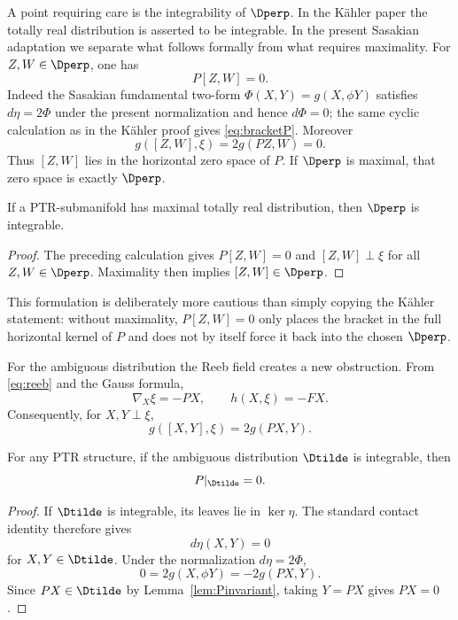 \documentclass[11pt]{article}
\theoremstyle{definition}\newtheorem{definition}[theorem]{Definition}\newtheorem{example}[theorem]{Example}
\theoremstyle{remark}\newtheorem{remark}[theorem]{Remark}
\begin{document}
A point requiring care is the integrability of $\Dperp$. In the K\"ahler paper the totally real distribution is asserted to be integrable. In the present Sasakian adaptation we separate what follows formally from what requires maximality. For $Z,W\in\Dperp$, one has
\begin{equation}\label{eq:bracketP}
 P[Z,W]=0.
\end{equation}
Indeed the Sasakian fundamental two-form $\Phi(X,Y)=g(X,\phi Y)$ satisfies $d\eta=2\Phi$ under the present normalization and hence $d\Phi=0$; the same cyclic calculation as in the K\"ahler proof gives \eqref{eq:bracketP}. Moreover
\[
 g([Z,W],\xi)=2g(PZ,W)=0.
\]
Thus $[Z,W]$ lies in the horizontal zero space of $P$. If $\Dperp$ is maximal, that zero space is exactly $\Dperp$.

\begin{proposition}\label{prop:Dperpintegrable}
If a PTR-submanifold has maximal totally real distribution, then $\Dperp$ is integrable.
\end{proposition}
\begin{proof}
The preceding calculation gives $P[Z,W]=0$ and $[Z,W]\perp\xi$ for all $Z,W\in\Dperp$. Maximality then implies $[Z,W]\in\Dperp$.
\end{proof}

This formulation is deliberately more cautious than simply copying the K\"ahler statement: without maximality, $P[Z,W]=0$ only places the bracket in the full horizontal kernel of $P$ and does not by itself force it back into the chosen $\Dperp$.

For the ambiguous distribution the Reeb field creates a new obstruction. From \eqref{eq:reeb} and the Gauss formula,
\begin{equation}\label{eq:reebparts}
 \nabla_X\xi=-PX,\qquad h(X,\xi)=-FX.
\end{equation}
Consequently, for $X,Y\perp\xi$,
\begin{equation}\label{eq:reebbracket}
 g([X,Y],\xi)=2g(PX,Y).
\end{equation}

\begin{proposition}
\label{prop:contact-isotropic}
For any PTR structure, if the ambiguous distribution \(\Dtilde\) is
integrable, then
\[
 P|_{\Dtilde}=0.
\]
\end{proposition}

\begin{proof}
If \(\Dtilde\) is integrable, its leaves lie in \(\ker\eta\).  The
standard contact identity therefore gives
\[
 d\eta(X,Y)=0
\]
for \(X,Y\in\Dtilde\).  Under the normalization \(d\eta=2\Phi\),
\[
 0=2g(X,\phi Y)=-2g(PX,Y).
\]
Since \(PX\in\Dtilde\) by Lemma~\ref{lem:Pinvariant}, taking \(Y=PX\)
gives \(PX=0\).
\end{proof}
\end{document}
